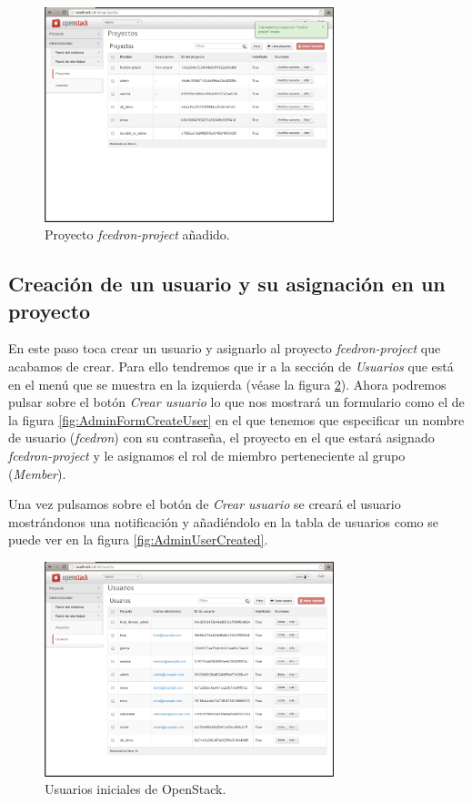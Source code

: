 \documentclass{article}
\begin{document}
\begin{figure}[h]
  \centering
    \includegraphics[width=0.75\textwidth]{img/m_005.png}
  \caption{Proyecto \emph{fcedron-project} añadido.}
  \label{fig:AdminProjectCreated}
\end{figure}

\clearpage
\subsection{Creación de un usuario y su asignación en un proyecto}
	En este paso toca crear un usuario y asignarlo al proyecto \emph{fcedron-project} que acabamos de crear. Para ello tendremos que ir a la sección de \emph{Usuarios} que está en el menú que se muestra en la izquierda (véase la figura \ref{fig:AdminInitUsers}). Ahora podremos pulsar sobre el botón \emph{Crear usuario} lo que nos mostrará un formulario como el de la figura \ref{fig:AdminFormCreateUser} en el que tenemos que especificar un nombre de usuario (\emph{fcedron}) con su contraseña, el proyecto en el que estará asignado \emph{fcedron-project} y le asignamos el rol de miembro perteneciente al grupo (\emph{Member}). 

		Una vez pulsamos sobre el botón de \emph{Crear usuario} se creará el usuario mostrándonos una notificación y añadiéndolo en la tabla de usuarios como se puede ver en la figura \ref{fig:AdminUserCreated}.
\begin{figure}[h]
  \centering
    \includegraphics[width=0.75\textwidth]{img/m_006.png}
  \caption{Usuarios iniciales de OpenStack.}
  \label{fig:AdminInitUsers}
\end{figure}
\end{document}

